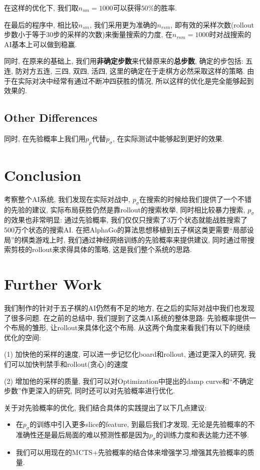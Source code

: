 \documentclass[twocolumn]{article}
\begin{document}
在这样的优化下, 我们取$n_{sm}=1000$可以获得$50\%$的胜率.

在最后的程序中, 相比较$n_{sm}$, 我们采用更为准确的$n_{rsm}$, 即有效的采样次数(rollout步数小于等于30步的采样的次数)来衡量搜索的力度, 在$n_{rsm}=1000$时对战搜索的AI基本上可以做到稳赢.

同时, 在原来的基础上, 我们用\textbf{非确定步数}来代替原来的\textbf{总步数}, 确定的步包括: 五连, 防对方五连, 三四, 双四, 活四, 这里的确定在于走棋方必然采取这样的策略. 由于在实际对决中经常有通过不断冲四获胜的情况, 所以这样的优化是完全能够起到效果的.

\subsection{Other Differences}

同时, 在先验概率上我们用$p_\rho$代替$p_\sigma$, 在实际测试中能够起到更好的效果.

\section{Conclusion}

考察整个AI系统, 我们发现在实际对战中, $p_\sigma$在搜索的时候给我们提供了一个不错的先验的建议, 实际布局获胜仍然是靠rollout的搜索枚举, 同时相比较暴力搜索, $p_\sigma$的效果也非常明显: 通过先验概率, 我们仅仅只搜索了3万个状态就能战胜搜索了500万个状态的搜索AI. 在把AlphaGo的算法思想移植到五子棋这类更需要“局部设局”的棋类游戏上时, 我们通过神经网络训练的先验概率来提供建议, 同时通过带搜索剪枝的rollout来求得具体的策略, 这是我们整个系统的思路.

\section{Further Work}

我们制作的针对于五子棋的AI仍然有不足的地方, 在之后的实际对战中我们也发现了很多问题. 在之前的总结中, 我们提到了这类AI系统的整体思路: 先验概率提供一个布局的雏形, 让rollout来具体化这个布局. 从这两个角度来看我们有以下的继续优化的空间:

(1) 加快他的采样的速度, 可以进一步记忆化board和rollout, 通过更深入的研究, 我们可以加快判禁手和rollout(贪心)的速度

(2) 增加他的采样的质量, 我们可以对Optimization中提出的damp curve和“不确定步数”作更深入的研究, 同时还可以对先验概率进行优化.

关于对先验概率的优化, 我们结合具体的实践提出了以下几点建议:

\begin{itemize}
	\item 在$p_\sigma$的训练中引入更多slice的feature, 到最后我们才发现, 无论是先验概率的不准确性还是最后局面的难以预测性都是因为$p_\sigma$的训练力度和表达能力还不够.
	\item 我们可以用现在的MCTS+先验概率的结合体来增强学习,增强其先验概率的质量.
\end{itemize}
\end{document}
